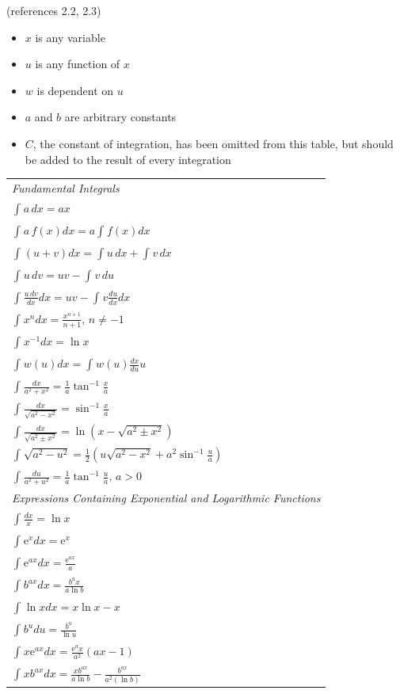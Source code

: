 \documentclass[
]{book}
\providecommand{\tightlist}{%
  \setlength{\itemsep}{0pt}\setlength{\parskip}{0pt}}
\begin{document}
(references 2.2, 2.3)

\begin{itemize}
\tightlist
\item
  \(x\) is any variable
\item
  \(u\) is any function of \(x\)
\item
  \(w\) is dependent on \(u\)
\item
  \(a\) and \(b\) are arbitrary constants
\item
  \(C\), the constant of integration, has been omitted from this table, but
  should be added to the result of every integration
\end{itemize}

\begin{longtable}[]{@{}l@{}}
\toprule
\endhead
\emph{Fundamental Integrals}\tabularnewline
\( \int_{}{} a \, dx = ax \)\tabularnewline
\( \int_{}{} a \, f\left(x\right) dx = a \int_{}{} f\left(x\right) dx \)\tabularnewline
\( \int_{}{} \left(u+v\right) dx = \int_{}{} u\,dx + \int_{}{}v\,dx \)\tabularnewline
\( \int_{}{} u\,dv = uv - \int_{}{}v\,du \)\tabularnewline
\( \int_{}{} \frac{u\,dv}{dx} dx = uv - \int_{}{} v \frac{du}{dx} dx\)\tabularnewline
\( \int_{}{} x^n dx = \frac{x^{n+1}}{n+1} \text{, } n \neq -1\)\tabularnewline
\( \int_{}{} x^{-1} dx = \ln{x}  \)\tabularnewline
\( \int_{}{} w \left( u \right) dx = \int_{}{} w\left( u \right) \frac{dx}{du} u \)\tabularnewline
\( \int_{}{} \frac{dx}{a^2 + x^2} = \frac{1}{a} \tan^{-1} \frac{x}{a} \)\tabularnewline
\( \int_{}{} \frac{dx}{\sqrt{a^2 - x^2}} = \sin^{-1} \frac{x}{a} \)\tabularnewline
\( \int_{}{} \frac{dx}{\sqrt{a^2 \pm x^2}} = \ln \left( x - \sqrt{a^2 \pm x^2} \right) \)\tabularnewline
\( \int_{}{} \sqrt{a^2 - u^2} = \frac{1}{2} \left( u \sqrt{a^2 - x^2} + a^2 \sin^{-1} \frac{u}{a} \right) \)\tabularnewline
\( \int_{}{} \frac{du}{a^2 + u^2} = \frac{1}{a} \tan^{-1} \frac{u}{a} \text{, } a \gt 0 \)\tabularnewline
\emph{Expressions Containing Exponential and Logarithmic Functions}\tabularnewline
\( \int_{}{} \frac{dx}{x} = \ln{x} \)\tabularnewline
\( \int_{}{} \mathrm{e}^{x} dx = \mathrm{e}^{x} \)\tabularnewline
\( \int_{}{} \mathrm{e}^{ax} dx = \frac{\mathrm{e}^{ax}}{a} \)\tabularnewline
\( \int_{}{} b^{ax} dx = \frac{b^ax}{a \ln{b}} \)\tabularnewline
\( \int_{}{} \ln{x} dx = x \ln{x} - x \)\tabularnewline
\( \int_{}{} b^{u} du = \frac{b^u}{\ln{u}} \)\tabularnewline
\( \int_{}{} x \mathrm{e}^{ax} dx = \frac{\mathrm{e}^ax}{a^2} \left( ax - 1 \right) \)\tabularnewline
\( \int_{}{} x b^{ax} dx = \frac{x b^{ax}}{a \ln{b} } - \frac{b^{ax}}{a^2 \left( \ln{b} \right) } \)\tabularnewline

\end{longtable}
\end{document}
